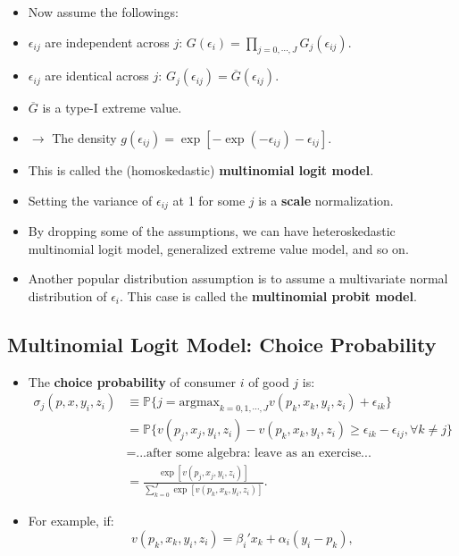 \documentclass[
]{book}
\providecommand{\tightlist}{%
  \setlength{\itemsep}{0pt}\setlength{\parskip}{0pt}}
\begin{document}
\begin{itemize}
\item
  Now assume the followings:
\item
  \(\epsilon_{ij}\) are independent across \(j\): \(G(\epsilon_i) = \prod_{j = 0, \cdots, J} G_j(\epsilon_{ij})\).
\item
  \(\epsilon_{ij}\) are identical across \(j\): \(G_j(\epsilon_{ij}) = \overline{G}(\epsilon_{ij})\).
\item
  \(\overline{G}\) is a type-I extreme value.
\item
  \(\rightarrow\) The density \(g(\epsilon_{ij}) = \exp[-\exp(-\epsilon_{ij}) - \epsilon_{ij}]\).
\item
  This is called the (homoskedastic) \textbf{multinomial logit model}.
\item
  Setting the variance of \(\epsilon_{ij}\) at 1 for some \(j\) is a \textbf{scale} normalization.
\item
  By dropping some of the assumptions, we can have heteroskedastic multinomial logit model, generalized extreme value model, and so on.
\item
  Another popular distribution assumption is to assume a multivariate normal distribution of \(\epsilon_i\). This case is called the \textbf{multinomial probit model}.
\end{itemize}

\hypertarget{multinomial-logit-model-choice-probability}{%
\subsection{Multinomial Logit Model: Choice Probability}\label{multinomial-logit-model-choice-probability}}

\begin{itemize}
\tightlist
\item
  The \textbf{choice probability} of consumer \(i\) of good \(j\) is:
  \begin{equation}
  \begin{split}
  \sigma_j(p, x, y_i, z_i) & \equiv \mathbb{P}\{j = \text{argmax}_{k = 0, 1, \cdots, J} v(p_k, x_k, y_i, z_i) + \epsilon_{ik}  \}\\
  &=\mathbb{P}\{v(p_j, x_j, y_i, z_i) -  v(p_k, x_k, y_i, z_i) \ge \epsilon_{ik} - \epsilon_{ij}, \forall k \neq j\}\\
  & = \text{...after some algebra: leave as an exercise...}\\
  &= \frac{\exp[v(p_j, x_j, y_i, z_i) ]}{\sum_{k = 0}^J \exp[v(p_k, x_k, y_i, z_i)] }.
  \end{split}
  \end{equation}
\item
  For example, if:
  \begin{equation}
  v(p_k, x_k, y_i, z_i) = \beta_i'x_k + \alpha_i (y_i - p_k),
  \end{equation}
\end{itemize}
\end{document}
